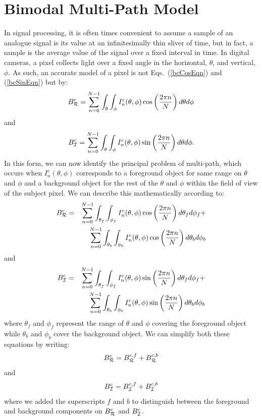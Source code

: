 \documentclass[10pt]{article}
\begin{document}
\section{Bimodal Multi-Path Model}
\noindent In signal processing, it is often times convenient to assume a sample of an analogue signal is its value at an infinitesimally thin sliver of time, but in fact, a sample is the average value of the signal over a fixed interval in time.  In digital cameras, a pixel collects light over a fixed angle in the horizontal, $\theta$, and vertical, $\phi$.  As such, an accurate model of a pixel is not Eqs.~(\ref{bcCosEqn}) and (\ref{bcSinEqn}) but by:
\begin{equation}
    B^c_{\cal R}  =  \sum_{n=0}^{N-1} \int_{\theta}\int_{\phi} I_n^c(\theta, \phi) 
    			    \cos\left(\frac{2\pi n}{N}\right) d\theta d\phi
\end{equation}
and
\begin{equation}
    B^c_{\cal I}  = \sum_{n=0}^{N-1} \int_{\theta}\int_{\phi} I_n^c(\theta, \phi) 
    		          \sin\left(\frac{2\pi n}{N}\right) d\theta d\phi.
\end{equation}
In this form, we can now identify the principal problem of multi-path, which occurs when $I_n^c(\theta, \phi)$ corresponds to a foreground object for same range on $\theta$ and $\phi$ and a background object for the rest of the $\theta$ and $\phi$ within the field of view of the subject pixel. We can describe this mathematically according to:
\begin{eqnarray}
    B^c_{\cal R}  & = & \sum_{n=0}^{N-1} \int_{\theta_f}\int_{\phi_f} I_n^c(\theta, \phi) 
    			    \cos\left(\frac{2\pi n}{N}\right) d\theta_f d\phi_f + 					\nonumber \\
& &			     \sum_{n=0}^{N-1} \int_{\theta_b}\int_{\phi_b} I_n^c(\theta, \phi) 
    			    \cos\left(\frac{2\pi n}{N}\right) d\theta_b d\phi_b
\end{eqnarray}
and
\begin{eqnarray}
    B^c_{\cal I}  & = &  \sum_{n=0}^{N-1} \int_{\theta_f}\int_{\phi_f} I_n^c(\theta, \phi) 
    			    \sin\left(\frac{2\pi n}{N}\right) d\theta_f d\phi_f +     					\nonumber \\
& &			     \sum_{n=0}^{N-1} \int_{\theta_b}\int_{\phi_b} I_n^c(\theta, \phi) 
    			    \sin\left(\frac{2\pi n}{N}\right) d\theta_b d\phi_b
\end{eqnarray}
where $\theta_f$ and $\phi_f$ represent the range of $\theta$ and $\phi$ covering the foreground object while $\theta_b$ and $\phi_b$ cover the background object. We can simplify both these equations by writing:
\begin{equation}
    B^c_{\cal R}  =  B^{c,f}_{\cal R} + B^{c,b}_{\cal R}
\end{equation}
and
\begin{equation}
    B^c_{\cal I}  =  B^{c,f}_{\cal I} + B^{c,b}_{\cal I}
\end{equation}
where we added the superscripts $f$ and $b$ to distinguish between the foreground and background components on $B^c_{\cal R}$ and $B^c_{\cal I}$. 
\end{document}
